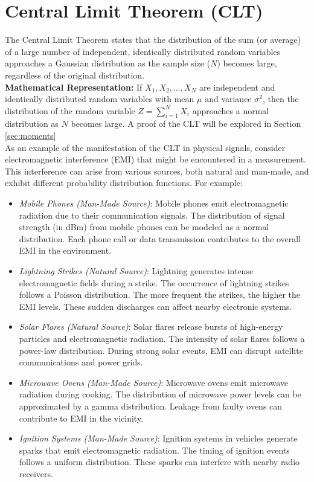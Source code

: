 \documentclass[12pt]{book}
\theoremstyle{definition}
\begin{document}
\section{Central Limit Theorem (CLT)}

The Central Limit Theorem states that the distribution of the sum (or average) of a large number of independent, identically distributed random variables approaches a Gaussian distribution as the sample size (\(N\)) becomes large, regardless of the original distribution.\\
    
\textbf{Mathematical Representation:} If \(X_1, X_2, \ldots, X_N\) are independent and identically distributed random variables with mean \(\mu\) and variance \(\sigma^2\), then the distribution of the random variable \(Z = \sum_{i=1}^{N} X_i \) approaches a  normal distribution as \(N\) becomes large. A proof of the CLT will be explored in Section \ref{sec:moments}\\


As an example of the manifestation of the CLT in physical signals, consider electromagnetic interference (EMI) that might be encountered in a measurement. This interference can arise from various sources, both natural and man-made, and exhibit different probability distribution functions. For example:

\begin{itemize}
    \item \emph{Mobile Phones (Man-Made Source)}: Mobile phones emit electromagnetic radiation due to their communication signals. The distribution of signal strength (in dBm) from mobile phones can be modeled as a normal distribution. Each phone call or data transmission contributes to the overall EMI in the environment.
    \item \emph{Lightning Strikes (Natural Source)}: Lightning generates intense electromagnetic fields during a strike. The occurrence of lightning strikes follows a Poisson distribution. The more frequent the strikes, the higher the EMI levels. These sudden discharges can affect nearby electronic systems.
    \item \emph{Solar Flares (Natural Source)}: Solar flares release bursts of high-energy particles and electromagnetic radiation. The intensity of solar flares follows a power-law distribution. During strong solar events, EMI can disrupt satellite communications and power grids.
    \item \emph{Microwave Ovens (Man-Made Source)}: Microwave ovens emit microwave radiation during cooking. The distribution of microwave power levels can be approximated by a gamma distribution. Leakage from faulty ovens can contribute to EMI in the vicinity.
    \item \emph{Ignition Systems (Man-Made Source)}: Ignition systems in vehicles generate sparks that emit electromagnetic radiation. The timing of ignition events follows a uniform distribution. These sparks can interfere with nearby radio receivers.
\end{itemize}
\end{document}
